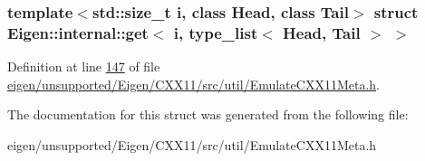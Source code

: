 \subsubsection*{template$<$std\+::size\+\_\+t i, class Head, class Tail$>$\newline
struct Eigen\+::internal\+::get$<$ i, type\+\_\+list$<$ Head, Tail $>$ $>$}



Definition at line \hyperlink{eigen_2unsupported_2_eigen_2_c_x_x11_2src_2util_2_emulate_c_x_x11_meta_8h_source_l00147}{147} of file \hyperlink{eigen_2unsupported_2_eigen_2_c_x_x11_2src_2util_2_emulate_c_x_x11_meta_8h_source}{eigen/unsupported/\+Eigen/\+C\+X\+X11/src/util/\+Emulate\+C\+X\+X11\+Meta.\+h}.



The documentation for this struct was generated from the following file\+:\begin{DoxyCompactItemize}
\item 
eigen/unsupported/\+Eigen/\+C\+X\+X11/src/util/\+Emulate\+C\+X\+X11\+Meta.\+h\end{DoxyCompactItemize}

